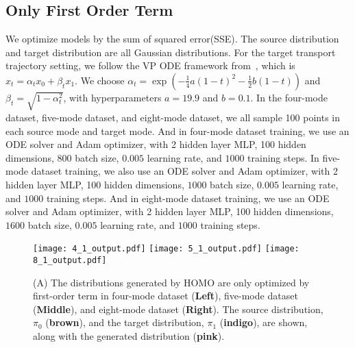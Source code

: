 \subsection{Only First Order Term}\label{sec:app:rectified_flow}

We optimize models by the sum of squared error(SSE). The source distribution and target distribution are all Gaussian distributions. For the target transport trajectory setting, we follow the VP ODE framework from~\cite{rectified_flow}, which is $x_t = \alpha_t x_0 + \beta_t x_1$. We choose $\alpha_t = \exp(-\frac{1}{4} a(1-t)^2 - \frac{1}{2} b(1-t))$ and $\beta_t = \sqrt{1 - \alpha_t^2}$, with hyperparameters $a = 19.9$ and $b = 0.1$. In the four-mode dataset, five-mode dataset, and eight-mode dataset, we all sample 100 points in each source mode and target mode. And in four-mode dataset training, we use an ODE solver and Adam optimizer, with 2 hidden layer MLP, 100 hidden dimensions, $800$ batch size, $0.005$ learning rate, and $1000$ training steps. In five-mode dataset training, we also use an ODE solver and Adam optimizer, with 2 hidden layer MLP, 100 hidden dimensions, $1000$ batch size, $0.005$ learning rate, and $1000$ training steps. And in eight-mode dataset training, we use an ODE solver and Adam optimizer, with 2 hidden layer MLP, 100 hidden dimensions, $1600$ batch size, $0.005$ learning rate, and $1000$ training steps. 


\begin{figure}[!ht]
\centering
\texttt{[image: 4\_1\_output.pdf]}
\texttt{[image: 5\_1\_output.pdf]}
\texttt{[image: 8\_1\_output.pdf]}
\caption{
(A) The distributions generated by HOMO are only optimized by first-order term in four-mode dataset (\textbf{Left}), five-mode dataset (\textbf{Middle}), and eight-mode dataset (\textbf{Right}). 
The source distribution, $\pi_0$ ({\textbf{brown}}), and the target distribution, $\pi_1$ ({\textbf{indigo}}), are shown, along with the generated distribution ({\textbf{pink}}). 
}
\label{fig:1_distribution}
\end{figure}


